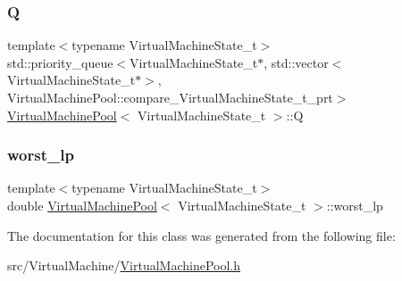 \subsubsection{\texorpdfstring{Q}{Q}}
{\footnotesize\ttfamily template$<$typename Virtual\+Machine\+State\+\_\+t$>$ \\
std\+::priority\+\_\+queue$<$Virtual\+Machine\+State\+\_\+t$\ast$, std\+::vector$<$Virtual\+Machine\+State\+\_\+t$\ast$$>$, Virtual\+Machine\+Pool\+::compare\+\_\+\+Virtual\+Machine\+State\+\_\+t\+\_\+prt$>$ \hyperlink{class_virtual_machine_pool}{Virtual\+Machine\+Pool}$<$ Virtual\+Machine\+State\+\_\+t $>$\+::Q}

\mbox{\label{class_virtual_machine_pool_a758c6a2a065cb17a0255cb6ad9da3ece}} 
\subsubsection{\texorpdfstring{worst\+\_\+lp}{worst\_lp}}
{\footnotesize\ttfamily template$<$typename Virtual\+Machine\+State\+\_\+t$>$ \\
double \hyperlink{class_virtual_machine_pool}{Virtual\+Machine\+Pool}$<$ Virtual\+Machine\+State\+\_\+t $>$\+::worst\+\_\+lp}



The documentation for this class was generated from the following file\+:\begin{DoxyCompactItemize}
\item 
src/\+Virtual\+Machine/\hyperlink{_virtual_machine_pool_8h}{Virtual\+Machine\+Pool.\+h}\end{DoxyCompactItemize}
